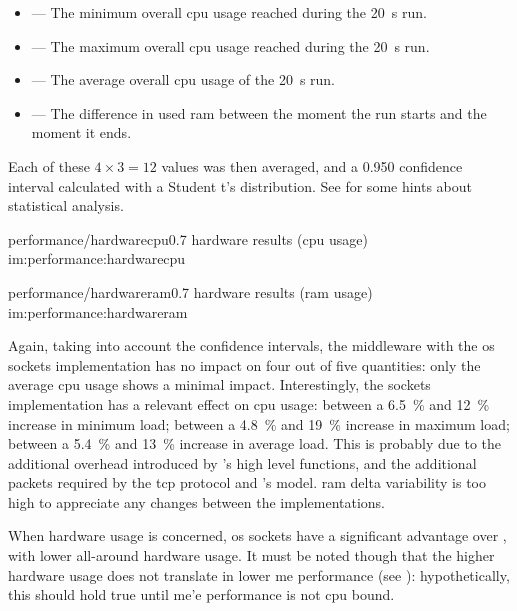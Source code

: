 \begin{itemize}
	\item {} --- The minimum overall \gls{cpu} usage reached during the \SI{20}{\second} run.
	\item {} --- The maximum overall \gls{cpu} usage reached during the \SI{20}{\second} run.
	\item {} --- The average overall \gls{cpu} usage of the \SI{20}{\second} run.
	\item {} --- The difference in used \gls{ram} between the moment the run starts and the moment it ends.
\end{itemize}

\FLOATnoindent Each of these $4\times3=12$ values was then averaged, and a \num{0,950} confidence interval calculated with a Student t's distribution. See  for some hints about statistical analysis.

\begin{image}
	{performance/hardwarecpu}{0.7}
	{hardware results (\gls{cpu} usage)}
	{im:performance:hardwarecpu}
	{}
\end{image}

\begin{image}
	{performance/hardwareram}{0.7}
	{hardware results (\gls{ram} usage)}
	{im:performance:hardwareram}
	{}
\end{image}

Again, taking into account the confidence intervals, the \gls{middleware} with the \gls{os} sockets implementation has no impact on four out of five quantities: only the average \gls{cpu} usage shows a minimal impact. Interestingly, the  sockets implementation has a relevant effect on \gls{cpu} usage: between a \SI{6,5}{\percent} and \SI{12}{\percent} increase in minimum load; between a \SI{4,8}{\percent} and \SI{19}{\percent} increase in maximum load; between a \SI{5,4}{\percent} and \SI{13}{\percent} increase in average load. This is probably due to the additional overhead introduced by 's high level functions, and the additional packets required by the \gls{tcp} protocol and 's  model. \gls{ram} delta variability is too high to appreciate any changes between the implementations.

When hardware usage is concerned, \gls{os} sockets have a significant advantage over , with lower all-around hardware usage. It must be noted though that the higher hardware usage does not translate in lower \gls{me} performance (see ): hypothetically, this should hold true until \gls{me}'e performance is not \gls{cpu} bound.

